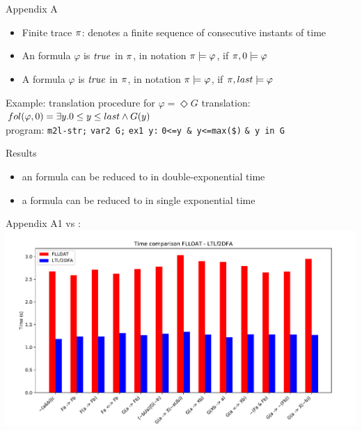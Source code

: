 \documentclass[10pt]{beamer}
\begin{document}
\section*{}
\begin{frame}{Appendix A}
\begin{itemize}
\item Finite trace $\pi$: denotes a finite sequence of consecutive instants of time
\vspace{0.2cm}
\item An \LTLf formula $\varphi$ is $\mathit{true}$ in $\pi$, in notation $\pi \models \varphi$, if $\pi, 0 \models \varphi$
\vspace{0.2cm}
\item A \PLTL formula $\varphi$ is $\mathit{true}$ in $\pi$, in notation $\pi \models \varphi$, if $\pi, last \models \varphi$

\end{itemize}
	\begin{exampleblock}{\normalsize Example: translation procedure for $\varphi = \Diamond G$}
\FOL translation: $fol(\varphi, 0) = \exists y. 0 \leq y \leq last \wedge G(y)$\\
\medskip
\MONA program: \texttt{m2l-str;} \texttt{var2 G;} \texttt{ex1 y:} \texttt{0<=y \& y<=max(\$)} \texttt{\& y in G}
	\end{exampleblock}
\begin{block}{Results}
\begin{itemize}
\item an \LTLf formula can be reduced to \DFA in double-exponential time
\item a \PLTL formula can be reduced to \DFA in single exponential time
\end{itemize}
\end{block}
\end{frame}

\begin{frame}{Appendix A1}
	\LTLfToDFA vs \FLLOAT:
	\includegraphics[width=\textwidth]{../images/new-time-comp-eps-converted-to}
\end{frame}
\end{document}
